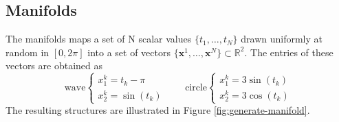 \subsection*{Manifolds}
The manifolds maps a set of N scalar values $\{t_1, \ldots, t_N\}$ drawn uniformly at random in $[0, 2\pi]$ into a set of vectors $\{\mathbf{x}^1, \ldots, \mathbf{x}^N\} \subset \mathbb{R}^2$. The entries of these vectors are obtained as
$$
\text{wave}  \begin{cases}
      x_1^k = t_k - \pi \\
      x_2^k = \sin(t_k)
    \end{cases}  \qquad \text{circle}  \begin{cases}
     x_1^k = 3\sin(t_k) \\
      x_2^k = 3\cos(t_k)
    \end{cases}
$$
The resulting structures are illustrated in Figure \ref{fig:generate-manifold}.
